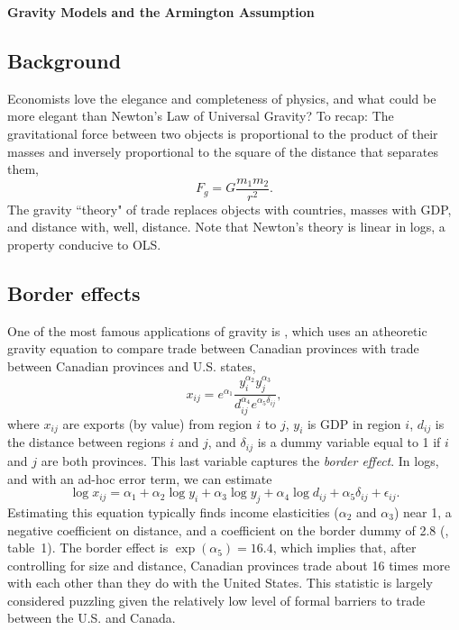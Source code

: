 \documentclass[11pt, pdftex]{article}
\newcommand{\ph}{\phantom}
\begin{document}
\ph{whatever}
\medskip

\centerline{\Large \bf Gravity Models and the Armington Assumption}
\medskip

\subsection*{Background}
Economists love the elegance and completeness of physics, and what could be more elegant than Newton's Law of Universal Gravity?  To recap: The gravitational force between two objects is proportional to the product of their masses and inversely proportional to the square of the distance that separates them,
%
 \begin{equation}
 F_g=G\frac{m_1 m_2}{r^2}.
 \end{equation}
%
The gravity ``theory" of trade replaces objects with countries, masses with GDP, and distance with, well, distance.  Note that Newton's theory is linear in logs, a property conducive to OLS.

\subsection*{Border effects}
One of the most famous applications of gravity is \citet{mccallum}, which uses an atheoretic gravity equation to compare trade between Canadian provinces with trade between Canadian provinces and U.S. states,
\begin{equation}
x_{ij}=e^{\alpha_1}\frac{y_i^{\alpha_2}y_j^{\alpha_3}}{d_{ij}^{\alpha_4}e^{\alpha_5 \delta_{ij}}},
\end{equation}
%
where $x_{ij}$ are exports (by value) from  region $i$ to $j$, $y_i$  is GDP in region $i$, $d_{ij}$ is the distance between regions  $i$ and  $j$, and $\delta_{ij}$   is a dummy variable equal to 1 if $i$ and $j$ are both provinces.  This last variable captures the \textit{border effect}. In logs, and with an ad-hoc error term, we can estimate
\begin{equation}
\label{eq:simple_gravity}
\log x_{ij}=\alpha_1+\alpha_2 \log y_i+\alpha_3 \log y_j + \alpha_4 \log d_{ij}+ \alpha_5 \delta_{ij} + \epsilon_{ij}.
\end{equation}
Estimating this equation typically finds income elasticities ($\alpha_2$ and $\alpha_3$) near 1, a negative coefficient on distance, and a coefficient on the border dummy of 2.8 (\cite{andersonVanwin}, table~1).  The border effect is $\exp(\alpha_5)=16.4$, which implies that, after controlling for size and distance, Canadian provinces trade about 16 times more with each other than they do with the United States.  This statistic is largely considered puzzling given the relatively low level of formal barriers to trade between the U.S. and Canada.
\end{document}
